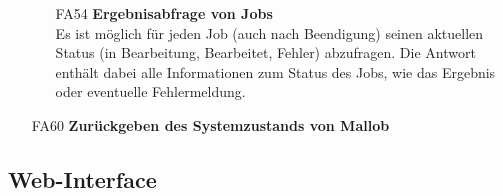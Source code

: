 \begin{itemize}
\begin{itemize}
        \item[FA54] \textbf{Ergebnisabfrage von Jobs} \\
        Es ist möglich für jeden Job (auch nach Beendigung) seinen aktuellen Status (in Bearbeitung, Bearbeitet, Fehler) abzufragen. Die Antwort  enthält dabei alle Informationen zum Status des Jobs, wie das Ergebnis oder eventuelle Fehlermeldung.
    \end{itemize}
    

    \item[FA60] \textbf{Zurückgeben des Systemzustands von Mallob} \\
    
    

\end{itemize}


\subsection{Web-Interface}



